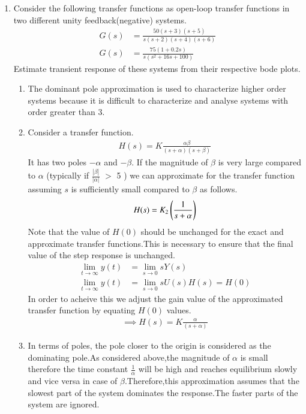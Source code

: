 \begin{enumerate}[label=\thesubsection.\arabic*.,ref=\thesubsection.\theenumi]

\item Consider the following transfer functions as open-loop transfer functions in two different unity feedback(negative) systems.
\begin{align}
G(s) &= \frac{50(s+3)(s+5)}{s(s+2)(s+4)(s+6)} \\
G(s) &= \frac{75(1+0.2s)}{s(s^{2}+16s+100)} 
\end{align}
Estimate transient response of these systems from their respective bode plots.\\
\solution 
\begin{enumerate}
\item  The dominant pole approximation is used to characterize higher order systems because it is difficult to characterize and analyse systems with order greater than 3.
\item Consider a transfer function.
\begin{align}
H(s) = K\frac{\alpha\beta}{(s+\alpha)(s+\beta)}
\end{align}
It has two poles $-\alpha$ and $-\beta $. If the magnitude of $\beta$ is very large compared to $\alpha$ (typically if $\frac{|\beta|}{|\alpha|}$ $>$ 5  ) we can approximate for the transfer function assuming $s$ is sufficiently small compared to $\beta$ as follows.
\begin{align}
H(s) = K_{2}\left(\frac{1}{s+\alpha}\right)
\end{align}
Note that the value of $H(0)$ should be unchanged for the exact and approximate transfer functions.This is necessary to ensure that the final value of the step response is unchanged.
\begin{align}
\lim_{t\to\infty} y(t) &= \lim_{s\to 0} sY(s) \\
\lim_{t\to\infty} y(t) &= \lim_{s\to 0} sU(s)H(s) = H(0)
\end{align}
In order to acheive this we adjust the gain value of the approximated transfer function by equating $H(0)$ values.
\begin{align}
\implies H(s) = K\frac{\alpha}{(s+\alpha)}
\end{align}
\item In terms of poles, the pole closer to the origin is considered as the dominating pole.As considered above,the magnitude of $\alpha$ is small therefore the time constant $\frac{1}{\alpha}$ will be high and reaches equilibrium slowly and vice versa in case of  $\beta$.Therefore,this approximation assumes that the slowest part of the system dominates the response.The faster parts of the system are ignored.

\end{enumerate}
\end{enumerate}
